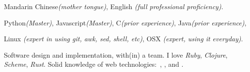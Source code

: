 \documentclass[10pt,a4paper]{article} %
\begin{document}

 {
  Mandarin Chinese\textit{(mother tongue)},
  English \textit{(full professional proficiency)}.
}

 {
  Python\textit{(Master)},
  Javascript\textit{(Master)},
  C\textit{(prior experience)},
  Java\textit{(prior experience)},
}

 {
  Linux \textit{(expert in using git, awk, sed, shell, etc)},
  OSX \textit{(expert, using it everyday)}.
}

 {
  Software design and implementation, with(in) a team.
  I love \textit{Ruby}, \textit{Clojure}, \textit{Scheme}, \textit{Rust}.
  Solid knowledge of web technologies:\ , ,  and .
}





\end{document}
